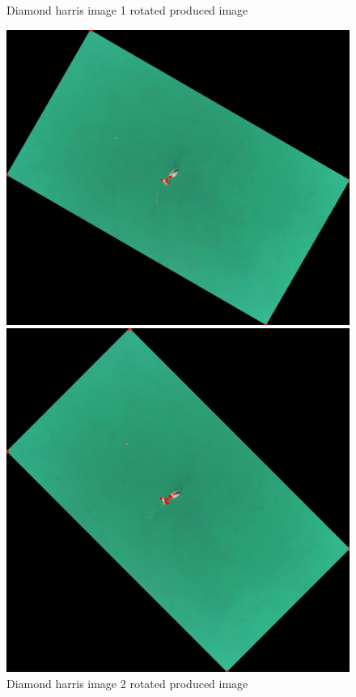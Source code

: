 \documentclass[conference]{IEEEtran}
\begin{document}
\begin{figure}[!htb]
\begin{minipage}[b]{0.2\textwidth}
    \caption{Diamond harris image 1 rotated produced image}
    \label{Diamond harris image 1 rotated produced image}
  \end{minipage}
  \hfill
  \begin{minipage}[b]{0.2\textwidth}
    \includegraphics[width=\textwidth]{../programme/results/Task_1/rotated_experiements/Harris/dugong/image_2.jpg}
    \caption{Diamond harris image 2 rotated produced image}
    \label{Diamond harris image 2 rotated produced image}
  \end{minipage}
  \hfill
    \begin{minipage}[b]{0.2\textwidth}
    \includegraphics[width=\textwidth]{../programme/results/Task_1/rotated_experiements/Harris/dugong/image_3.jpg}

\end{minipage}
\end{figure}
\end{document}
